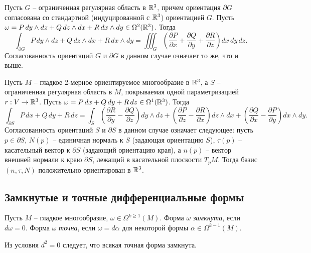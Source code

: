 \begin{example}
Пусть $G$ -- ограниченная регулярная область в $\mathbb{R}^3$, причем ориентация $\partial G$ согласована со стандартной (индуцированной с $\mathbb{R}^3$) ориентацией $G$. Пусть $\omega = P\, dy \wedge dz + Q\, dz \wedge dx + R\, dx \wedge dy \in \Omega^2(\mathbb{R}^3)$. Тогда
\[
\int_{\partial G} P\, dy \wedge dz + Q\, dz \wedge dx + R\, dx \wedge dy = \iiint_G \left( \frac{\partial P}{\partial x} + \frac{\partial Q}{\partial y} + \frac{\partial R}{\partial z} \right) dx \, dy \, dz.
\]
Согласованность ориентаций $G$ и $\partial G$ в данном случае означает то же, что и выше.
\end{example}

\begin{example}
Пусть $M$ -- гладкое 2-мерное ориентируемое многообразие в $\mathbb{R}^3$, а $S$ -- ограниченная регулярная область в $M$, покрываемая одной параметризацией $r: V \to \mathbb{R}^3$. Пусть $\omega = P\, dx + Q\, dy + R\, dz \in \Omega^1(\mathbb{R}^3)$. Тогда
\[
\int_{\partial S} P\, dx + Q\, dy + R\, dz = \int_S \left( \frac{\partial R}{\partial y} - \frac{\partial Q}{\partial z} \right) dy \wedge dz + \left( \frac{\partial P}{\partial z} - \frac{\partial R}{\partial x} \right) dz \wedge dx + \left( \frac{\partial Q}{\partial x} - \frac{\partial P}{\partial y} \right) dx \wedge dy.
\]
Согласованность ориентаций $S$ и $\partial S$ в данном случае означает следующее: пусть $p \in \partial S$, $N(p)$ -- единичная нормаль к $S$ (задающая ориентацию $S$), $\tau(p)$ -- касательный вектор к $\partial S$ (задающий ориентацию края), а $n(p)$ -- вектор внешней нормали к краю $\partial S$, лежащий в касательной плоскости $T_p M$. Тогда базис $(n, \tau, N)$ положительно ориентирован в $\mathbb{R}^3$.
\end{example}

\subsection{Замкнутые и точные дифференциальные формы}

\begin{definition}
	Пусть $M$ -- гладкое многообразие, $\omega \in \Omega^{k\geq 1}(M)$.
    Форма $\omega$ \textit{замкнута}, если $d\omega = 0$.
    Форма $\omega$ \textit{точна}, если $\omega = d\alpha$ для некоторой формы $\alpha \in \Omega^{k-1}(M)$.
\end{definition}

\begin{note}
	Из условия $d^2 = 0$ следует, что всякая точная форма замкнута.
\end{note}


